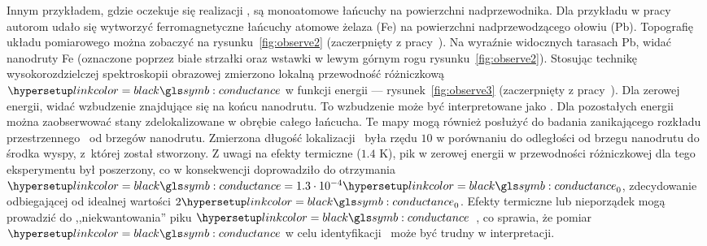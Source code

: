 Innym przykładem, gdzie oczekuje się realizacji \MZM, są monoatomowe łańcuchy na powierzchni nadprzewodnika.
Dla przykładu w pracy~\cite{nadj-perge.drozdov.2014} autorom udało się wytworzyć ferromagnetyczne łańcuchy atomowe żelaza (Fe) na powierzchni nadprzewodzącego ołowiu (Pb).
Topografię układu pomiarowego można zobaczyć na rysunku~\ref{fig:observe2} (zaczerpnięty z pracy~\cite{nadj-perge.drozdov.2014}).
Na wyraźnie widocznych tarasach Pb, widać nanodruty Fe (oznaczone poprzez białe strzałki oraz wstawki w lewym górnym rogu rysunku~\ref{fig:observe2}).
Stosując technikę wysokorozdzielczej spektroskopii obrazowej
zmierzono lokalną przewodność różniczkową $\conductance$ w funkcji energii --- rysunek~\ref{fig:observe3} (zaczerpnięty z pracy~\cite{nadj-perge.drozdov.2014}).
Dla zerowej energii, widać wzbudzenie znajdujące się na końcu nanodrutu.
To wzbudzenie może być interpretowane jako \MZM.
Dla pozostałych energii można zaobserwować stany zdelokalizowane w obrębie całego łańcucha.
Te mapy mogą również posłużyć do badania zanikającego rozkładu przestrzennego \MZM\ od brzegów nanodrutu.
Zmierzona długość lokalizacji \MZM\ była rzędu $10$ w porównaniu do odległości od brzegu nanodrutu do środka wyspy, z~której został stworzony.
Z uwagi na efekty termiczne ($1.4$ K), pik w zerowej energii w przewodności różniczkowej dla tego eksperymentu był poszerzony, co w konsekwencji doprowadziło do otrzymania $\conductance= 1.3\cdot 10^{-4} \conductance_0$,  zdecydowanie odbiegającej od idealnej wartości $2\conductance_0$.
Efekty termiczne lub nieporządek mogą prowadzić do ,,niekwantowania'' piku $\conductance$~\cite{stanescu.2016}, co sprawia, że pomiar $\conductance$ w celu identyfikacji \MZM\ może być trudny w interpretacji.


